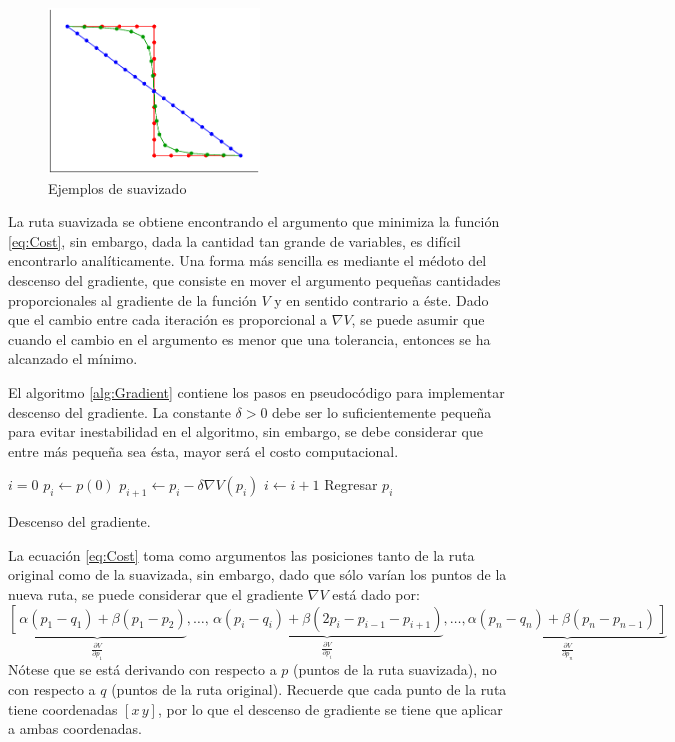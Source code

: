 \documentclass[a4paper]{article}
\newcommand\ddfrac[2]{\frac{\displaystyle #1}{\displaystyle #2}}
\begin{document}
\begin{figure}
\centering
\includegraphics[width=0.5\textwidth]{Figures/Smooth.eps}
\caption{Ejemplos de suavizado}
\label{fig:Smooth}
\end{figure}

La ruta suavizada se obtiene encontrando el argumento que minimiza la función \ref{eq:Cost}, sin embargo, dada la cantidad tan grande de variables, es difícil encontrarlo analíticamente. Una forma más sencilla es mediante el médoto del descenso del gradiente, que consiste en mover el argumento pequeñas cantidades proporcionales al gradiente de la función $V$ y en sentido contrario a éste. Dado que el cambio entre cada iteración es proporcional a $\nabla V$, se puede asumir que cuando el cambio en el argumento es menor que una tolerancia, entonces se ha alcanzado el mínimo. 

El algoritmo \ref{alg:Gradient} contiene los pasos en pseudocódigo para implementar descenso del gradiente. La constante $\delta > 0$ debe ser lo suficientemente pequeña para evitar inestabilidad en el algoritmo, sin embargo, se debe considerar que entre más pequeña sea ésta, mayor será el costo computacional. 

\begin{algorithm}
\DontPrintSemicolon
{}
$i = 0$\;
$p_i \leftarrow p(0)$\;
{
\BlankLine
  $p_{i+1} \leftarrow p_i - \delta\nabla V(p_i)$\;
  $i \leftarrow i+1$
\BlankLine
}
Regresar $p_i$
\caption{Descenso del gradiente.}
\label{alg:Gradient}
\end{algorithm}

La ecuación \ref{eq:Cost} toma como argumentos las posiciones tanto de la ruta original como de la suavizada, sin embargo, dado que sólo varían los puntos de la nueva ruta, se puede considerar que el gradiente $\nabla V$ está dado por:
\begin{equation}
\underbrace{\left[\frac{}{}\alpha(p_1 - q_1)+\beta(p_1 - p_2)\right.}_{\ddfrac{\partial V}{\partial p_1}}
,\dots ,
\underbrace{\frac{}{}\alpha(p_i - q_i) + \beta(2p_i - p_{i-1} - p_{i+1})}_{\ddfrac{\partial V}{\partial p_i}}
,\dots ,
\underbrace{\left.\alpha(p_n-q_n)+\beta(p_n - p_{n-1})\frac{}{}\right]}_{\ddfrac{\partial V}{\partial p_n}}
\end{equation}
Nótese que se está derivando con respecto a $p$ (puntos de la ruta suavizada), no con respecto a $q$ (puntos de la ruta original). Recuerde que cada punto de la ruta tiene coordenadas $[x\,y]$, por lo que el descenso de gradiente se tiene que aplicar a ambas coordenadas. 
\end{document}

